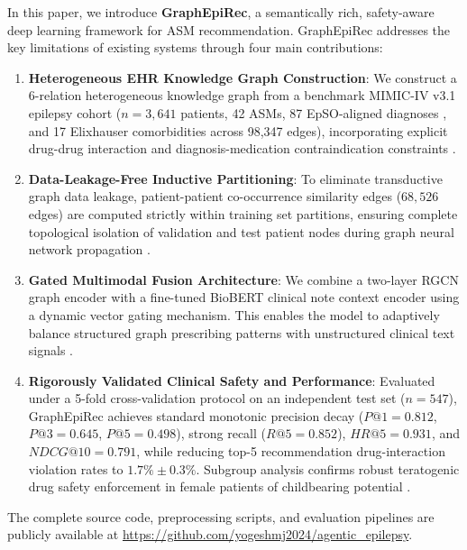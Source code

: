 \documentclass[11pt,a4paper]{article}
\begin{document}
In this paper, we introduce \textbf{GraphEpiRec}, a semantically rich, safety-aware deep learning framework for ASM recommendation. GraphEpiRec addresses the key limitations of existing systems through four main contributions:
\begin{enumerate}[leftmargin=*]
    \item \textbf{Heterogeneous EHR Knowledge Graph Construction}: We construct a 6-relation heterogeneous knowledge graph from a benchmark MIMIC-IV v3.1 epilepsy cohort ($n=3,641$ patients, 42 ASMs, 87 EpSO-aligned diagnoses \cite{sahoo2014epso}, and 17 Elixhauser comorbidities \cite{elixhauser1998comorbidity} across 98,347 edges), incorporating explicit drug-drug interaction \cite{wishart2018drugbank} and diagnosis-medication contraindication constraints \cite{glauser2013ilae}.
    \item \textbf{Data-Leakage-Free Inductive Partitioning}: To eliminate transductive graph data leakage, patient-patient co-occurrence similarity edges ($68,526$ edges) are computed strictly within training set partitions, ensuring complete topological isolation of validation and test patient nodes during graph neural network propagation \cite{hamilton2017inductive}.
    \item \textbf{Gated Multimodal Fusion Architecture}: We combine a two-layer RGCN graph encoder with a fine-tuned BioBERT clinical note context encoder using a dynamic vector gating mechanism. This enables the model to adaptively balance structured graph prescribing patterns with unstructured clinical text signals \cite{khaledi2023multimodal, vaswani2017attention}.
    \item \textbf{Rigorously Validated Clinical Safety and Performance}: Evaluated under a 5-fold cross-validation protocol on an independent test set ($n=547$), GraphEpiRec achieves standard monotonic precision decay ($P@1=0.812$, $P@3=0.645$, $P@5=0.498$), strong recall ($R@5=0.852$), $HR@5=0.931$, and $NDCG@10=0.791$, while reducing top-5 recommendation drug-interaction violation rates to $1.7\% \pm 0.3\%$. Subgroup analysis confirms robust teratogenic drug safety enforcement in female patients of childbearing potential \cite{tomson2018comparative}.
\end{enumerate}

The complete source code, preprocessing scripts, and evaluation pipelines are publicly available at \url{https://github.com/yogeshmj2024/agentic_epilepsy}.

\end{document}
